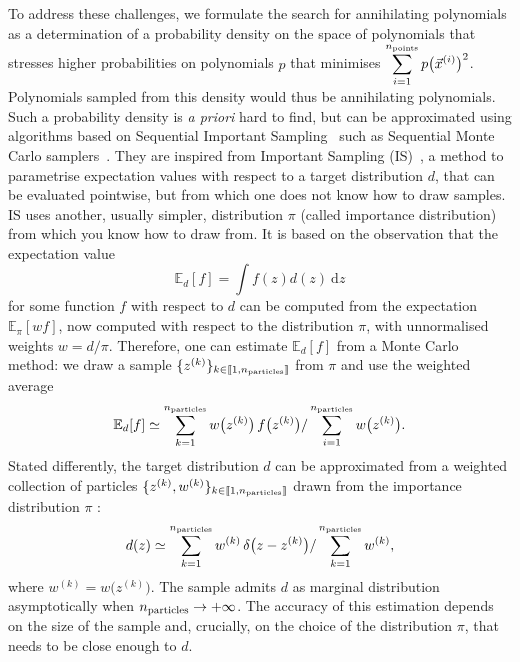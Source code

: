 \documentclass[11pt,a4paper]{article}
\renewcommand{\d}{\ensuremath{\mathrm{d}}\xspace}
\begin{document}
	To address these challenges, we formulate the search for annihilating polynomials as a determination of a probability density on the space of polynomials that stresses higher probabilities on polynomials $p$ that minimises $\displaystyle \sum_{i=1}^{n_{\rm points}}p\big(\vec{x}^{(i)}\big)^{2}$. Polynomials sampled from this density would thus be annihilating polynomials. Such a probability density is \textit{a priori} hard to find, but can be approximated using algorithms based on Sequential Important Sampling~\cite{Doucet2001,Liu2004} such as Sequential Monte Carlo samplers~\cite{del2006sequential}. They are inspired from Important Sampling (IS)~\cite{osti_4441935,RobertCasella2004}, a method to parametrise expectation values with respect to a target distribution $d$, that can be evaluated pointwise, but from which one does not know how to draw samples. IS uses another, usually simpler, distribution $\pi$ (called importance distribution) from which you know how to draw from. It is based on the observation that the expectation value
	\begin{equation}
		\mathbb{E}_{d}[f] = \int f(z)d(z)\ \d z
	\end{equation}
	for some function $f$ with respect to $d$ can be computed from the expectation $\mathbb{E}_{\pi}[w f]$, now computed with respect to the distribution $\pi$, with unnormalised weights $w = d/\pi$. Therefore, one can estimate $\mathbb{E}_{d}[f]$ from a Monte Carlo method: we draw a sample $\{z^{(k)}\}_{k\in\llbracket 1, n_{\rm particles}\rrbracket}$ from $\pi$ and use the weighted average
	\begin{equation}
		\mathbb{E}_{d}[f] \simeq \displaystyle \sum_{k=1}^{n_{\rm particles}} w\big(z^{(k)}\big)\,f\big(z^{(k)}\big)/\displaystyle \sum_{i=1}^{n_{\rm particles}} w\big(z^{(k)}\big).
	\end{equation}
	Stated differently, the target distribution $d$ can be approximated from a weighted collection of particles $\{z^{(k)},w^{(k)}\}_{k\in\llbracket 1, n_{\rm particles}\rrbracket}$ drawn from the importance distribution $\pi$ :
	\begin{equation}
		d(z) \simeq \displaystyle \sum_{k=1}^{n_{\rm particles}} w^{(k)}\,\delta\big(z-z^{(k)}\big)/\displaystyle \sum_{k=1}^{n_{\rm particles}} w^{(k)},
	\end{equation}
	where $w^{(k)} = w\big(z^{(k)}\big)$. The sample admits $d$ as marginal distribution asymptotically when $n_{\rm particles}\rightarrow+\infty$. The accuracy of this estimation depends on the size of the sample and, crucially, on the choice of the distribution $\pi$, that needs to be close enough to $d$. 
	
\end{document}

